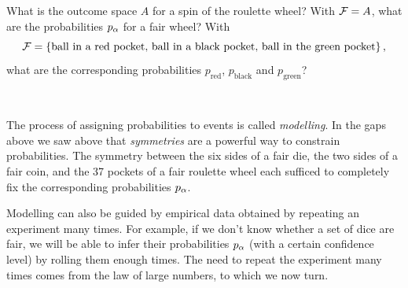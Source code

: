 \noindent What is the outcome space $A$ for a spin of the roulette wheel?
With $\mathcal F = A$, what are the probabilities $p_{\alpha}$ for a fair wheel?
With
\begin{equation*}
  \mathcal F = \left\{\mbox{ball in a red pocket, ball in a black pocket, ball in the green pocket}\right\},
\end{equation*}
what are the corresponding probabilities $p_{\text{red}}$, $p_{\text{black}}$ and $p_{\text{green}}$?
\begin{mdframed}
  \ \\[100 pt]
\end{mdframed}

The process of assigning probabilities to events is called \textit{modelling}.
In the gaps above we saw above that \textit{symmetries} are a powerful way to constrain probabilities.
The symmetry between the six sides of a fair die, the two sides of a fair coin, and the 37 pockets of a fair roulette wheel each sufficed to completely fix the corresponding probabilities $p_{\alpha}$.

Modelling can also be guided by empirical data obtained by repeating an experiment many times.
For example, if we don't know whether a set of dice are fair, we will be able to infer their probabilities $p_{\alpha}$ (with a certain confidence level) by rolling them enough times.
The need to repeat the experiment many times comes from the law of large numbers, to which we now turn.



